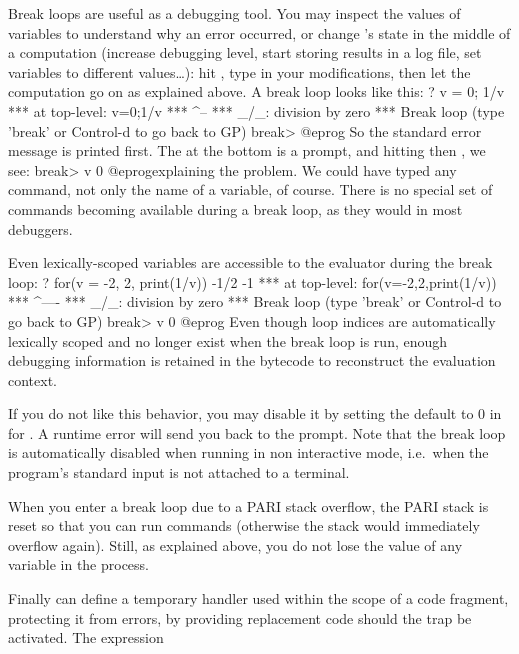 Break loops are useful as a debugging tool. You may inspect the values of
 variables to understand why an error occurred, or change
's state in the middle of a computation (increase debugging level,
start storing results in a log file, set variables to different values\dots):
hit , type in your modifications, then let the computation go on as
explained above. A break loop looks like this:
\bprog
? v = 0; 1/v
  ***   at top-level: v=0;1/v
  ***                      ^--
  *** _/_: division by zero
  ***   Break loop (type 'break' or Control-d to go back to GP)
break>
@eprog
\noindent So the standard error message is printed first. The
 at the bottom is a prompt, and hitting  then
, we see:
\bprog
break> v
0
@eprog\noindent explaining the problem. We could have typed any 
command, not only the name of a variable, of course. There is no special set
of commands becoming available during a break loop, as they would in most
debuggers.

Even lexically-scoped variables are accessible to the evaluator during the
break loop:
\bprog
? for(v = -2, 2, print(1/v))
-1/2
-1
  ***   at top-level: for(v=-2,2,print(1/v))
  ***                                   ^----
  *** _/_: division by zero
  ***   Break loop (type 'break' or Control-d to go back to GP)
break> v
0
@eprog\noindent
Even though loop indices are automatically lexically scoped and no longer
exist when the break loop is run, enough debugging information is retained in
the bytecode to reconstruct the evaluation context.

 If you do not like this behavior, you may disable it by
setting the default  to 0 in for . A runtime error
will send you back to the prompt. Note that the break loop is automatically
disabled when running  in non interactive mode, i.e.~when the
program's standard input is not attached to a terminal.

 When you enter a break loop due to a PARI stack
overflow, the PARI stack is reset so that you can run commands (otherwise the
stack would immediately overflow again). Still, as explained above, you do
not lose the value of any  variable in the process.

 Finally  can define a temporary handler
used within the scope of a code fragment, protecting it from errors, by
providing replacement code should the trap be activated. The expression

